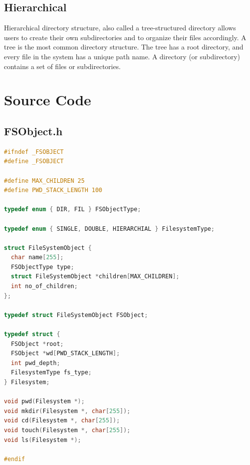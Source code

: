 \documentclass[13pt,oneside]{book}
\begin{document}
\subsection{Hierarchical}
Hierarchical directory structure, also called a tree-structured directory allows
users to create their own subdirectories and to organize their files accordingly. A
tree is the most common directory structure. The tree has a root directory, and
every file in the system has a unique path name. A directory (or subdirectory)
contains a set of files or subdirectories.


\section*{Source Code}
\small
\subsection{FSObject.h}
\begin{lstlisting}[language=C]
#ifndef _FSOBJECT
#define _FSOBJECT

#define MAX_CHILDREN 25
#define PWD_STACK_LENGTH 100

typedef enum { DIR, FIL } FSObjectType;

typedef enum { SINGLE, DOUBLE, HIERARCHIAL } FilesystemType;

struct FileSystemObject {
  char name[255];
  FSObjectType type;
  struct FileSystemObject *children[MAX_CHILDREN];
  int no_of_children;
};

typedef struct FileSystemObject FSObject;

typedef struct {
  FSObject *root;
  FSObject *wd[PWD_STACK_LENGTH];
  int pwd_depth;
  FilesystemType fs_type;
} Filesystem;

void pwd(Filesystem *);
void mkdir(Filesystem *, char[255]);
void cd(Filesystem *, char[255]);
void touch(Filesystem *, char[255]);
void ls(Filesystem *);

#endif
	\end{lstlisting}
\end{document}
